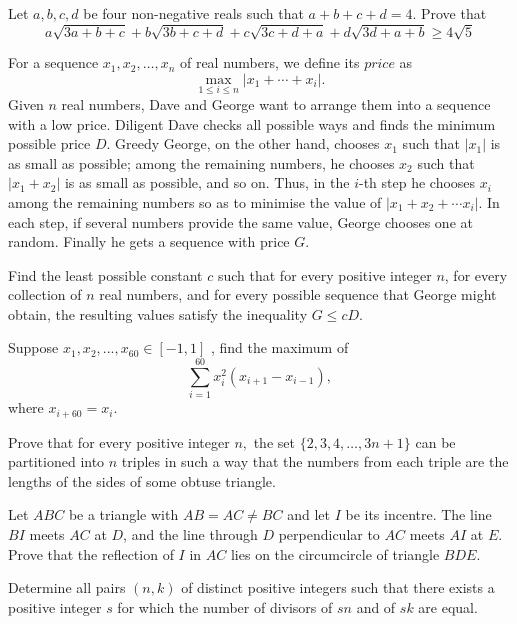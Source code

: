\documentclass[11pt]{scrartcl}
\begin{document}
\begin{problem}[554181002401534]
Let $ a,b,c,d $ be four non-negative reals such that $ a+b+c+d = 4 $. Prove that$$ a\sqrt{3a+b+c}+b\sqrt{3b+c+d}+c\sqrt{3c+d+a}+d\sqrt{3d+a+b} \ge 4\sqrt{5} $$
\end{problem}
\begin{problem}[557323499571799]
For a sequence $x_1,x_2,\ldots,x_n$ of real numbers, we define its $\textit{price}$ as\[\max_{1\le i\le n}|x_1+\cdots +x_i|.\]Given $n$ real numbers, Dave and George want to arrange them into a sequence with a low price. Diligent Dave checks all possible ways and finds the minimum possible price $D$. Greedy George, on the other hand, chooses $x_1$ such that $|x_1 |$ is as small as possible; among the remaining numbers, he chooses $x_2$ such that $|x_1 + x_2 |$ is as small as possible, and so on. Thus, in the $i$-th step he chooses $x_i$ among the remaining numbers so as to minimise the value of $|x_1 + x_2 + \cdots  x_i |$. In each step, if several numbers provide the same value, George chooses one at random. Finally he gets a sequence with price $G$.

Find the least possible constant $c$ such that for every positive integer $n$, for every collection of $n$ real numbers, and for every possible sequence that George might obtain, the resulting values satisfy the inequality $G\le cD$.
\end{problem}
\begin{problem}[559872560886502]
Suppose $x_1,x_2,...,x_{60}\in [-1,1]$ , find the maximum of
$$ \sum_{i=1}^{60}x_i^2(x_{i+1}-x_{i-1}),$$where $x_{i+60}=x_i$.
\end{problem}
\begin{problem}[563612490071424]
	Prove that for every positive integer $n,$ the set $\{2,3,4,\ldots,3n+1\}$ can be partitioned into $n$ triples in such a way that the numbers from each triple are the lengths of the sides of some obtuse triangle.
\end{problem}
\begin{problem}[567108152004136]
	Let $ABC$ be a triangle with $AB = AC \neq BC$ and let $I$ be its incentre. The line $BI$ meets $AC$ at $D$, and the line through $D$ perpendicular to $AC$ meets $AI$ at $E$. Prove that the reflection of $I$ in $AC$ lies on the circumcircle of triangle $BDE$.
\end{problem}
\begin{problem}[569685816807741]
Determine all pairs $(n, k)$ of distinct positive integers such that there exists a positive integer $s$ for which the number of divisors of $sn$ and of $sk$ are equal.
\end{problem}
\end{document}
